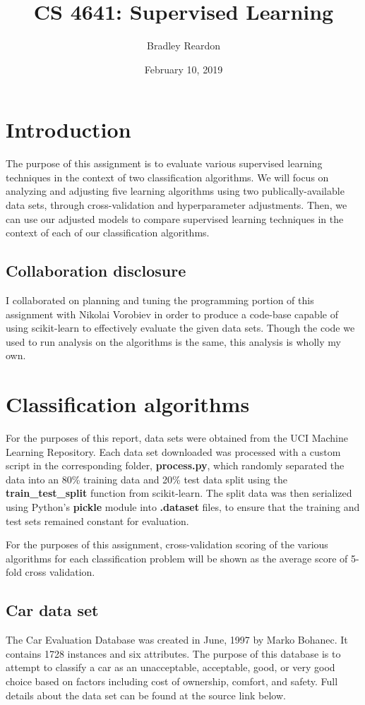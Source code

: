 \documentclass{article}
\title{\textbf{CS 4641:} Supervised Learning}
\author{Bradley Reardon}
\date{February 10, 2019}
\begin{document}
    \maketitle

    \section{Introduction}
    The purpose of this assignment is to evaluate various supervised learning techniques in the context of two classification algorithms. We will focus on analyzing and adjusting five learning algorithms using two publically-available data sets, through cross-validation and hyperparameter adjustments. Then, we can use our adjusted models to compare supervised learning techniques in the context of each of our classification algorithms.

    \subsection{Collaboration disclosure}
    I collaborated on planning and tuning the programming portion of this assignment with Nikolai Vorobiev in order to produce a code-base capable of using scikit-learn to effectively evaluate the given data sets. Though the code we used to run analysis on the algorithms is the same, this analysis is wholly my own.

    \section{Classification algorithms}
    For the purposes of this report, data sets were obtained from the UCI Machine Learning Repository. Each data set downloaded was processed with a custom script in the corresponding folder, \textbf{process.py}, which randomly separated the data into an 80\% training data and 20\% test data split using the \textbf{train\_test\_split} function from scikit-learn. The split data was then serialized using Python's \textbf{pickle} module into \textbf{.dataset} files, to ensure that the training and test sets remained constant for evaluation.

    For the purposes of this assignment, cross-validation scoring of the various algorithms for each classification problem will be shown as the average score of 5-fold cross validation.

    \subsection{Car data set}
    The Car Evaluation Database was created in June, 1997 by Marko Bohanec. It contains 1728 instances and six attributes. The purpose of this database is to attempt to classify a car as an unacceptable, acceptable, good, or very good choice based on factors including cost of ownership, comfort, and safety. Full details about the data set can be found at the source link below.
\end{document}

